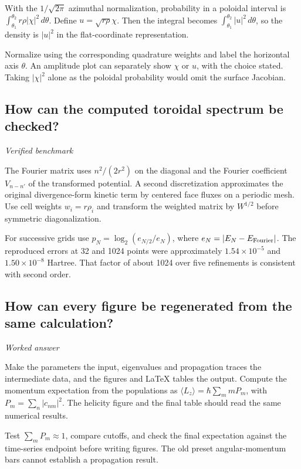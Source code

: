\documentclass[11pt]{article}
\begin{document}
With the \(1/\sqrt{2\pi}\) azimuthal normalization, probability in a poloidal interval is \(\int_{\theta_1}^{\theta_2}r\rho|\chi|^2\,d\theta\). Define \(u=\sqrt{r\rho}\chi\). Then the integral becomes \(\int_{\theta_1}^{\theta_2}|u|^2\,d\theta\), so the density is \(|u|^2\) in the flat-coordinate representation.

Normalize using the corresponding quadrature weights and label the horizontal axis \(\theta\). An amplitude plot can separately show \(\chi\) or \(u\), with the choice stated. Taking \(|\chi|^2\) alone as the poloidal probability would omit the surface Jacobian.

\subsection{How can the computed toroidal spectrum be checked?}
\label{problem:torus-convergence}
\textit{Verified benchmark}

The Fourier matrix uses \(n^2/(2r^2)\) on the diagonal and the Fourier coefficient \(V_{n-n'}\) of the transformed potential. A second discretization approximates the original divergence-form kinetic term by centered face fluxes on a periodic mesh. Use cell weights \(w_i=r\rho_i\) and transform the weighted matrix by \(W^{1/2}\) before symmetric diagonalization.

For successive grids use \(p_N=\log_2(e_{N/2}/e_N)\), where \(e_N=|E_N-E_{\rm Fourier}|\). The reproduced errors at 32 and 1024 points were approximately \(1.54\times10^{-5}\) and \(1.50\times10^{-8}\) Hartree. That factor of about 1024 over five refinements is consistent with second order.

\subsection{How can every figure be regenerated from the same calculation?}
\label{problem:torus-plot-workflow}
\textit{Worked answer}

Make the parameters the input, eigenvalues and propagation traces the intermediate data, and the figures and LaTeX tables the output. Compute the momentum expectation from the populations as \(\langle L_z\rangle=\hbar\sum_m mP_m\), with \(P_m=\sum_n|c_{nm}|^2\). The helicity figure and the final table should read the same numerical results.

Test \(\sum_mP_m\approx1\), compare cutoffs, and check the final expectation against the time-series endpoint before writing figures. The old preset angular-momentum bars cannot establish a propagation result.
\end{document}

